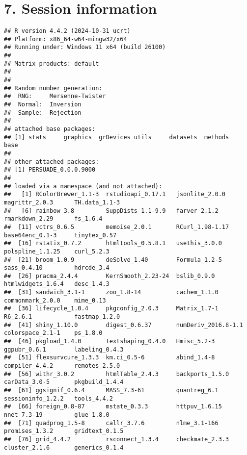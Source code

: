 \documentclass[
]{article}
\begin{document}
\clearpage

\section{7. Session information}\label{session-information}

\begin{verbatim}
## R version 4.4.2 (2024-10-31 ucrt)
## Platform: x86_64-w64-mingw32/x64
## Running under: Windows 11 x64 (build 26100)
## 
## Matrix products: default
## 
## 
## Random number generation:
##  RNG:     Mersenne-Twister 
##  Normal:  Inversion 
##  Sample:  Rejection 
##  
## attached base packages:
## [1] stats     graphics  grDevices utils     datasets  methods   base     
## 
## other attached packages:
## [1] PERSUADE_0.0.0.9000
## 
## loaded via a namespace (and not attached):
##   [1] RColorBrewer_1.1-3  rstudioapi_0.17.1   jsonlite_2.0.0      magrittr_2.0.3      TH.data_1.1-3      
##   [6] rainbow_3.8         SuppDists_1.1-9.9   farver_2.1.2        rmarkdown_2.29      fs_1.6.4           
##  [11] vctrs_0.6.5         memoise_2.0.1       RCurl_1.98-1.17     base64enc_0.1-3     tinytex_0.57       
##  [16] rstatix_0.7.2       htmltools_0.5.8.1   usethis_3.0.0       polspline_1.1.25    curl_5.2.3         
##  [21] broom_1.0.9         deSolve_1.40        Formula_1.2-5       sass_0.4.10         hdrcde_3.4         
##  [26] pracma_2.4.4        KernSmooth_2.23-24  bslib_0.9.0         htmlwidgets_1.6.4   desc_1.4.3         
##  [31] sandwich_3.1-1      zoo_1.8-14          cachem_1.1.0        commonmark_2.0.0    mime_0.13          
##  [36] lifecycle_1.0.4     pkgconfig_2.0.3     Matrix_1.7-1        R6_2.6.1            fastmap_1.2.0      
##  [41] shiny_1.10.0        digest_0.6.37       numDeriv_2016.8-1.1 colorspace_2.1-1    ps_1.8.0           
##  [46] pkgload_1.4.0       textshaping_0.4.0   Hmisc_5.2-3         ggpubr_0.6.1        labeling_0.4.3     
##  [51] flexsurvcure_1.3.3  km.ci_0.5-6         abind_1.4-8         compiler_4.4.2      remotes_2.5.0      
##  [56] withr_3.0.2         htmlTable_2.4.3     backports_1.5.0     carData_3.0-5       pkgbuild_1.4.4     
##  [61] ggsignif_0.6.4      MASS_7.3-61         quantreg_6.1        sessioninfo_1.2.2   tools_4.4.2        
##  [66] foreign_0.8-87      mstate_0.3.3        httpuv_1.6.15       nnet_7.3-19         glue_1.8.0         
##  [71] quadprog_1.5-8      callr_3.7.6         nlme_3.1-166        promises_1.3.2      gridtext_0.1.5     
##  [76] grid_4.4.2          rsconnect_1.3.4     checkmate_2.3.3     cluster_2.1.6       generics_0.1.4     

\end{verbatim}
\end{document}
